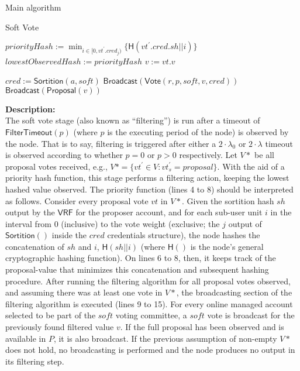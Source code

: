 \documentclass[10pt,a4paper]{article}
\begin{document}
\begin{section}{Main algorithm}
\begin{subsection}{Soft Vote}
\begin{algorithm}[H]
\begin{algorithmic}[1]
        \State $priorityHash := \min_{i \in [0, vt^\prime.cred_j)} \{ \mathsf{H}(vt^\prime.cred.sh || i)\}$
            \State $lowestObservedHash := priorityHash$
            \State $v := vt.v$
        \EndIf    
    \EndFor

            \State $cred := \mathsf{Sortition}(a, soft)$
                \State $\mathsf{Broadcast}(\mathsf{Vote}(r, p, soft, v, cred))$
                    \State $\mathsf{Broadcast}(\mathsf{Proposal}(v))$
                \EndIf
            \EndIf
        \EndFor
    \EndIf

    \EndFunction
    \end{algorithmic}
\end{algorithm}

\noindent \textbf{Description:}\\
The soft vote stage (also known as ``filtering'') is run after a timeout of $\mathsf{FilterTimeout}(p)$
(where $p$ is the executing period of the node) is observed by the node. 
That is to say, filtering is triggered after either a $2\cdot\lambda_0$ or $2\cdot\lambda$ timeout is observed according 
to whether $p=0$ or $p>0$ respectively.
Let $V*$ be all proposal votes received, e.g., $V*=\{vt^\prime\in V : vt^\prime_s = proposal\}$.
With the aid of a priority hash function, this stage performs a filtering action,
keeping the lowest hashed value observed.
The priority function (lines 4 to 8) should be interpreted as follows. Consider every proposal vote $vt$ in $V*$.
Given the sortition hash $sh$ output by the $\mathsf{VRF}$ for the proposer account, and for each sub-user unit $i$ 
in the interval from $0$ (inclusive) to the vote weight (exclusive; the $j$ output of $\mathsf{Sortition}()$ inside 
the $cred$ credentials structure), the node hashes the concatenation of $sh$ and $i$, $\mathsf{H}(sh||i)$ 
(where $\mathsf{H}()$ is the node's general cryptographic hashing function). On lines 6 to 8, 
then, it keeps track of the proposal-value that minimizes this concatenation and subsequent hashing procedure.
After running the filtering algorithm for all proposal votes observed, and assuming there was at least one vote
in $V*$, the broadcasting section of the filtering algorithm is executed (lines 9 to 15).
For every online managed account selected to be part of the $soft$ voting committee, a $soft$ vote is
broadcast for the previously found filtered value $v$. If the full proposal has been observed and is available in $P$,
it is also broadcast. 
If the previous assumption of non-empty $V*$ does not hold, no broadcasting is performed and the node produces no
output in its filtering step.


\end{subsection}
\end{section}
\end{document}

